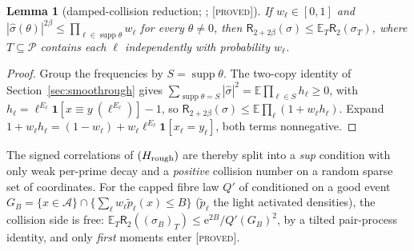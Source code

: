 \documentclass[10pt,reqno]{amsart}
\newtheorem{lemma}[theorem]{Lemma}
\theoremstyle{definition}
\theoremstyle{remark}
\newcommand{\A}{\mathcal A}
\newcommand{\E}{\mathbb E}
\newcommand{\ind}{\mathbf 1}
\newcommand{\e}{\mathrm e}
\newcommand{\lab}[1]{\textup{[\textsc{#1}]}}
\begin{document}
\begin{lemma}[damped-collision reduction; {\cite[Lemma~1.1]{LS4}}; \lab{proved}]\label{lem:damped}
If $w_\ell\in[0,1]$ and $|\hat\sigma(\theta)|^{2\beta}\leq\prod_{\ell\in\operatorname{supp}\theta}w_\ell$ for every $\theta\neq0$,
then $\mathsf R_{2+2\beta}(\sigma)\leq\E_T\mathsf R_2(\sigma_T)$, where $T\subseteq\mathcal P$ contains each
$\ell$ independently with probability $w_\ell$.
\end{lemma}
\begin{proof}
Group the frequencies by $S=\operatorname{supp}\theta$.  The two-copy identity of
Section~\ref{sec:smoothrough} gives $\sum_{\operatorname{supp}\theta=S}|\hat\sigma|^2=\E\prod_{\ell\in S}h_\ell\geq0$, with
$h_\ell=\ell^{E_\ell}\ind[x\equiv y\ (\ell^{E_\ell})]-1$, so
$\mathsf R_{2+2\beta}(\sigma)\leq\E\prod_\ell(1+w_\ell h_\ell)$.  Expand
$1+w_\ell h_\ell=(1-w_\ell)+w_\ell\ell^{E_\ell}\ind[x_\ell=y_\ell]$, both terms nonnegative.
\end{proof}
The signed correlations of $(H_{\rm rough})$ are thereby split into a
\emph{sup} condition with only weak per-prime decay and a \emph{positive}
collision number on a random sparse set of coordinates.  For the capped
fibre law $Q'$ of \cite{KA2} conditioned on a good event
$G_B=\{x\in\A\}\cap\{\sum_\ell w_\ell\tilde p_\ell(x)\leq B\}$ ($\tilde p_\ell$ the light activated
densities), the collision side is free: $\E_T\mathsf R_2((\sigma_B)_T)\leq\e^{2B}/Q'(G_B)^2$,
by a tilted pair-process identity, and only \emph{first} moments enter
\cite[Lemma~2.1, Prop.~4.1]{LS4} \lab{proved}.
\end{document}
